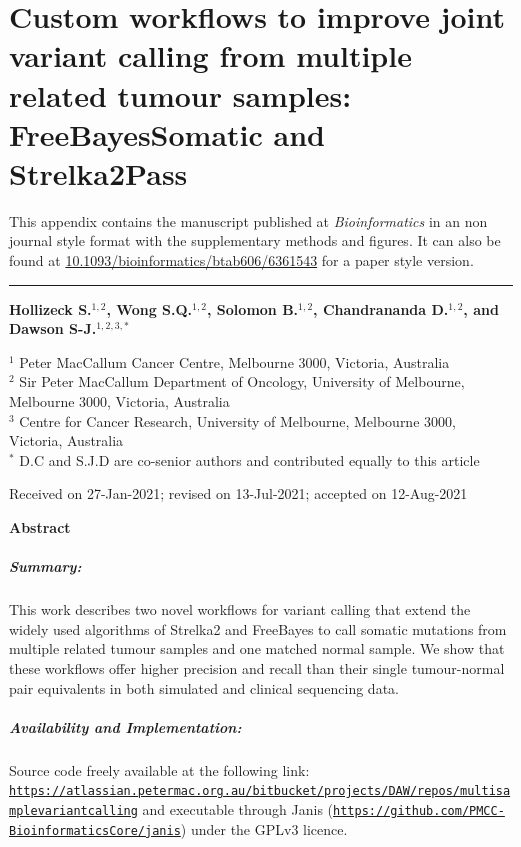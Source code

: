
\chapter[Strelka2Pass and FreeBayesSomatic publication]{Custom workflows to improve joint variant calling from multiple related tumour samples: FreeBayesSomatic and Strelka2Pass}
\label{ch:appendixManuscript}

This appendix contains the manuscript published at \textit{Bioinformatics} in an non journal style format with the supplementary methods and figures. It can also be found at \href{https://doi.org/10.1093/bioinformatics/btab606/6361543}{10.1093/bioinformatics/btab606/6361543} for a paper style version.
\vspace{1em}
\hrule
\vspace{2em}

{\Large \textbf{Hollizeck S.$^{1,2}$, Wong S.Q.$^{1,2}$, Solomon B.$^{1,2}$, Chandrananda D.$^{1,2}$, and Dawson S-J.$^{1,2,3,*}$}}

{
$^1$ Peter MacCallum Cancer Centre, Melbourne 3000, Victoria, Australia\\
$^2$ Sir Peter MacCallum Department of Oncology, University of Melbourne, Melbourne 3000, Victoria, Australia\\
$^3$ Centre for Cancer Research, University of Melbourne, Melbourne 3000, Victoria, Australia\\
\vspace{0.5em}
$^*$ D.C and S.J.D are co-senior authors and contributed equally to this article
}

{\small
Received on 27-Jan-2021; revised on 13-Jul-2021; accepted on 12-Aug-2021
}

{\Large \textbf{Abstract}}
\vspace{-2em}
\paragraph{\textbf{Summary:}} This work describes two novel workflows for variant calling that extend the widely used algorithms of Strelka2 and FreeBayes to call somatic mutations from multiple related tumour samples and one matched normal sample. We show that these workflows offer higher precision and recall than their single tumour-normal pair equivalents in both simulated and clinical sequencing data.
\vspace{-2em}
\paragraph{\textbf{Availability and Implementation:}} Source code freely available at the following link:
\href{https://atlassian.petermac.org.au/bitbucket/projects/DAW/repos/multisamplevariantcalling}{\nolinkurl{https://atlassian.petermac.org.au/bitbucket/projects/DAW/repos/multisamplevariantcalling}}
and executable through Janis (\href{https://github.com/PMCC-BioinformaticsCore/janis}{\nolinkurl{https://github.com/PMCC-BioinformaticsCore/janis}}) under the GPLv3 licence.
\vspace{-2em}
